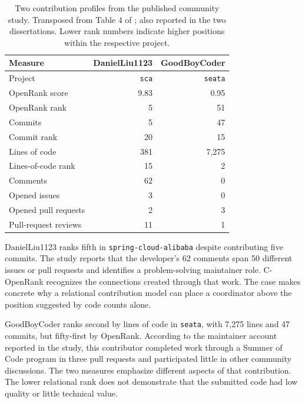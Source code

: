 \begin{table}[tbp]
\caption{Two contribution profiles from the published community study. Transposed from Table 4 of \citet{zhao2024}; also reported in the two dissertations. Lower rank numbers indicate higher positions within the respective project.}
\label{tab:ch5-cases}
\centering\small
\renewcommand{\arraystretch}{1.12}
\begin{tabularx}{\linewidth}{@{}Xrr@{}}
\toprule
Measure&DanielLiu1123&GoodBoyCoder\\
\midrule
Project&\texttt{sca}&\texttt{seata}\\
OpenRank score&9.83&0.95\\
OpenRank rank&5&51\\
Commits&5&47\\
Commit rank&20&15\\
Lines of code&381&7,275\\
Lines-of-code rank&15&2\\
Comments&62&0\\
Opened issues&3&0\\
Opened pull requests&2&3\\
Pull-request reviews&11&1\\
\bottomrule
\end{tabularx}
\end{table}

DanielLiu1123 ranks fifth in \texttt{spring-cloud-alibaba} despite contributing five commits. The study reports that the developer's 62 comments span 50 different issues or pull requests and identifies a problem-solving maintainer role. C-OpenRank recognizes the connections created through that work. The case makes concrete why a relational contribution model can place a coordinator above the position suggested by code counts alone.

GoodBoyCoder ranks second by lines of code in \texttt{seata}, with 7,275 lines and 47 commits, but fifty-first by OpenRank. According to the maintainer account reported in the study, this contributor completed work through a Summer of Code program in three pull requests and participated little in other community discussions. The two measures emphasize different aspects of that contribution. The lower relational rank does not demonstrate that the submitted code had low quality or little technical value.

